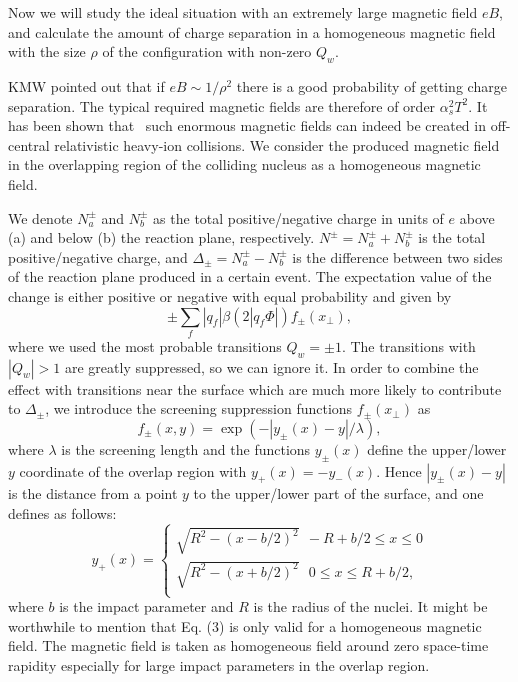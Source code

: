 \documentclass[twocolumn,showpacs,preprintnumbers,amsmath,amssymb]{revtex4}
\begin{document}
Now we will study the ideal situation with an extremely large magnetic field $eB$, and calculate the amount of charge separation in a homogeneous
magnetic field with the size $\rho$ of the configuration with non-zero $Q_{w}$.

KMW pointed out that if $eB\sim 1/{\rho^2}$  there is a good probability of getting charge separation.  The typical required magnetic fields are therefore of
order  $\alpha_{s}^{2}T^{2}$. It has been shown that~\cite{lab12,lab13,lab14,lab15,lab16} such enormous magnetic fields can indeed be created in off-central relativistic
heavy-ion collisions.  We consider the produced magnetic field in the overlapping region of the colliding nucleus as a homogeneous magnetic field.

We denote $N_{a}^{\pm}$ and $N_{b}^{\pm}$  as the total positive/negative charge in units of $e$ above (a)
and below (b) the reaction plane, respectively. $N^{\pm} = N_{a}^{\pm}+ N_{b}^{\pm}$ is  the total
positive/negative charge, and $\Delta_{\pm}=N_{a}^{\pm}-N_{b}^{\pm}$ is the difference between
two sides of the reaction plane produced in a certain event. The expectation value of the change is either
positive or negative with equal probability and given by
\begin{equation}%
\pm\sum_{f}|q_{f}|\beta(2|q_{f}\Phi|)f_{\pm}(x_{\perp}),
\label{eq:eq3} %
\end{equation}
where we used the most probable transitions $Q_{w}=\pm1$. The transitions with $|Q_{w}|>1$ are greatly suppressed, so we can ignore it.
In order to combine the effect with  transitions near the surface which are much more likely to contribute to $\Delta_{\pm}$, we introduce
the screening suppression functions $f_{\pm}(x_{\perp})$ as
\begin{equation} %
f_{\pm}(x,y)=\exp(-|y_{\pm}(x)-y|/\lambda),
\label{eq:eq4} %
\end{equation}
where $\lambda$ is the screening length and the functions $y_{\pm}(x)$ define the upper/lower $y$
coordinate of the overlap region with $y_{+}(x)=-y_{-}(x)$. Hence $|y_{\pm}(x)-y|$ is the distance from a point $y$ to the upper/lower part of the surface, and
one defines as follows:
\begin{equation}  %
y_{+}(x)=
 \left\{
\begin{aligned}
\sqrt{R^{2}-(x-b/2)^{2}}~~-R+b/2\leq x\leq0\\
\sqrt{R^{2}-(x+b/2)^{2}}~~~0\leq x\leq {R+b/2},\\
\end{aligned}
\right.
\label{eq:eq5} %
\end{equation}
where $b$ is the impact parameter and $R$ is the radius of the nuclei. It might be worthwhile to mention that Eq. (3) is only valid for a homogeneous magnetic field.
The magnetic field is taken as homogeneous  field around zero space-time rapidity especially for large impact
parameters in the overlap region.
\end{document}
